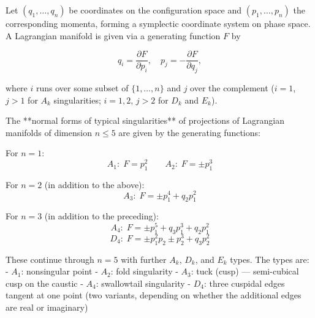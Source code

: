 Let $(q_1, \ldots, q_n)$ be coordinates on the configuration space and $(p_1, \ldots, p_n)$ the corresponding momenta, forming a symplectic coordinate system on phase space. A Lagrangian manifold is given via a generating function $F$ by

$$q_i = \frac{\partial F}{\partial p_i}, \quad p_j = -\frac{\partial F}{\partial q_j},$$

where $i$ runs over some subset of $\{1,\ldots,n\}$ and $j$ over the complement ($i=1$, $j>1$ for $A_k$ singularities; $i=1,2$, $j>2$ for $D_k$ and $E_k$).

The **normal forms of typical singularities** of projections of Lagrangian manifolds of dimension $n \leq 5$ are given by the generating functions:

For $n = 1$:
$$A_1: \; F = p_1^2 \qquad A_2: \; F = \pm p_1^3$$

For $n = 2$ (in addition to the above):
$$A_3: \; F = \pm p_1^4 + q_2 p_1^2$$

For $n = 3$ (in addition to the preceding):
$$A_4: \; F = \pm p_1^5 + q_3 p_1^3 + q_2 p_1^2$$
$$D_4: \; F = \pm p_1^2 p_2 \pm p_2^3 + q_3 p_2^2$$

These continue through $n=5$ with further $A_k$, $D_k$, and $E_k$ types. The types are:
- $A_1$: nonsingular point
- $A_2$: fold singularity
- $A_3$: tuck (cusp) — semi-cubical cusp on the caustic
- $A_4$: swallowtail singularity
- $D_4$: three cuspidal edges tangent at one point (two variants, depending on whether the additional edges are real or imaginary)
